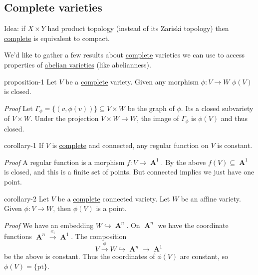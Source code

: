 \documentclass[10pt,]{book}
\makeatletter
\renewcommand*{\proofname}{Proof}
\renewenvironment{proof}[1][\proofname]{\par
  \pushQED{\qed}%
  \normalfont \topsep6\p@\@plus6\p@\relax
  \trivlist
  \item\relax
    {\itshape
    #1\@addpunct{.}}\hspace\labelsep\ignorespaces
}{%
  \popQED\endtrivlist\@endpefalse
}
\numberwithin{equation}{section}
\DeclareMathOperator{\aff}{\mathbf{A}}
\makeatother
\begin{document}
\subsection[{Complete varieties}]{Complete varieties}\label{subsec-complete-vars}
\hypertarget{p-19}{}%
Idea: if \(X \times Y\) had product topology (instead of its Zariski topology) then \hyperref[def-abelian-complete-var]{complete} is equivalent to compact.%
\par
\hypertarget{p-20}{}%
We'd like to gather a few results about \hyperref[def-abelian-complete-var]{complete} varieties we can use to access properties of \hyperref[def-buntes-abvar]{abelian varieties} (like abelianness).%
\begin{proposition}{}{}{proposition-1}%
\hypertarget{p-21}{}%
Let \(V\) be a \hyperref[def-abelian-complete-var]{complete} variety. Given any morphism \(\phi\colon V \to W\) \(\phi (V) \) is closed.%
\end{proposition}
\begin{proof}\hypertarget{proof-2}{}
\hypertarget{p-22}{}%
Let \(\Gamma_\phi = \{(v, \phi(v))\} \subseteq V\times W\) be the graph of \(\phi\). Its a closed subvariety of \(V\times W\). Under the projection \(V\times W \to W\), the image of \(\Gamma_\phi\) is \(\phi(V)\) and thus closed.%
\end{proof}
\begin{corollary}{}{}{corollary-1}%
\hypertarget{p-23}{}%
If \(V\) is \hyperref[def-abelian-complete-var]{complete} and connected, any regular function on \(V\) is constant.%
\end{corollary}
\begin{proof}\hypertarget{proof-3}{}
\hypertarget{p-24}{}%
A regular function is a morphism \(f\colon V \to \aff^1\). By the above \(f(V) \subseteq \aff^1\) is closed, and this is a finite set of points. But connected implies we just have one point.%
\end{proof}
\begin{corollary}{}{}{corollary-2}%
\hypertarget{p-25}{}%
Let \(V \) be a \hyperref[def-abelian-complete-var]{complete} connected variety. Let \(W\) be an affine variety. Given \(\phi\colon V\to W\), then \(\phi (V)\) is a point.%
\end{corollary}
\begin{proof}\hypertarget{proof-4}{}
\hypertarget{p-26}{}%
We have an embedding \(W \hookrightarrow \aff^n\). On \(\aff^n\) we have the coordinate functions \(\aff^n \xrightarrow{x_i} \aff^1\). The composition%
\begin{equation*}
V \xrightarrow\phi W \hookrightarrow\aff^n \to \aff^1
\end{equation*}
be the above is constant. Thus the coordinates of \(\phi(V)\) are constant, so \(\phi(V) = \{\text{pt}\}\).%
\end{proof}
\end{document}

